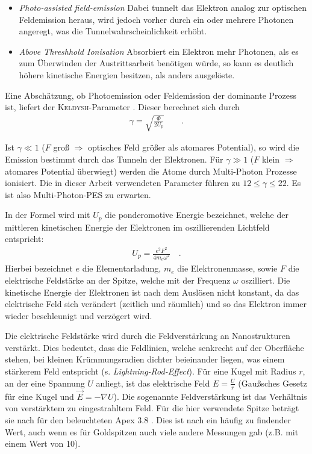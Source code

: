 \documentclass[bachelor,       %
               twoside,        %
               BCOR10mm,       %
               english,ngerman, %
               final,          %
               ]{GAUBM}
\begin{document}
\begin{itemize}
	\item \textit{Photo-assisted field-emission} Dabei tunnelt das Elektron analog zur optischen Feldemission heraus, wird jedoch vorher durch ein oder mehrere Photonen angeregt, was die Tunnelwahrscheinlichkeit erhöht.
	
	\item \textit{Above Threshhold Ionisation}
	Absorbiert ein Elektron mehr Photonen, als es zum Überwinden der Austrittsarbeit benötigen würde, so kann es deutlich höhere kinetische Energien besitzen, als anders ausgelöste.
	
\end{itemize}
Eine Abschätzung, ob Photoemission oder Feldemission der dominante Prozess ist, liefert der \textsc{Keldysh}-Parameter \cite{keldysh1965}.
Dieser berechnet sich durch
\begin{align}
	\gamma=\sqrt{\frac{\Phi}{2U_p}}\qquad .
	\label{eq:keldysh}
\end{align}

Ist $\gamma\ll 1$ ($F$ groß $\Rightarrow$ optisches Feld grö{\ss}er als atomares Potential), so wird die Emission bestimmt durch das Tunneln der Elektronen.
Für $\gamma\gg 1$ ($F$ klein $\Rightarrow$ atomares Potential überwiegt) werden die Atome durch Multi-Photon Prozesse ionisiert.\newline
Die in dieser Arbeit verwendeten Parameter führen zu $12\leq\gamma\leq22$.
Es ist also Multi-Photon-PES zu erwarten.

In der Formel wird mit $U_{p}$ die ponderomotive Energie bezeichnet, welche der mittleren kinetischen Energie der Elektronen im oszillierenden Lichtfeld entspricht:
\begin{align}
	U_p=\frac{e^2F^2}{4m_e\omega^2} \quad .
	\label{eq:ponderomotiv}
\end{align}
Hierbei bezeichnet $e$ die Elementarladung, $m_e$ die Elektronenmasse, sowie $F$ die elektrische Feldstärke an der Spitze, welche mit der Frequenz $\omega$ oszilliert.
Die kinetische Energie der Elektronen ist nach dem Auslösen nicht konstant, da das elektrische Feld sich verändert (zeitlich und räumlich) und so das Elektron immer wieder beschleunigt und verzögert wird.

Die elektrische Feldstärke wird durch die Feldverstärkung an Nanostrukturen verstärkt.
Dies bedeutet, dass die Feldlinien, welche senkrecht auf der Oberfläche stehen, bei kleinen Krümmungsradien dichter beieinander liegen, was einem stärkerem Feld entspricht (s. \textit{Lightning-Rod-Effect}).
Für eine Kugel mit Radius $r$, an der eine Spannung $U$ anliegt, ist das elektrische Feld $E=\frac{U}{r}$ (Gaußsches Gesetz für eine Kugel und $\vec E=-\nabla U$).
Die sogenannte Feldverstärkung ist das Verhältnis von verstärktem zu eingestrahltem Feld.
Für die hier verwendete Spitze beträgt sie nach \cite{benni_15} für den beleuchteten Apex $3.8$ .
Dies ist nach \cite{thomas_2016} ein häufig zu findender Wert, auch wenn es für Goldspitzen auch viele andere Messungen gab (z.B. \cite{ropers_2007} mit einem Wert von 10).\newline\newline
\end{document}
